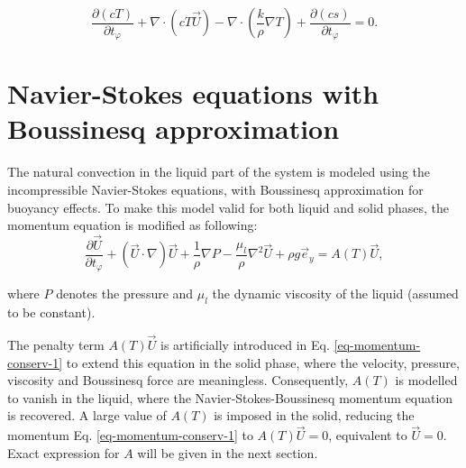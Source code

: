 \begin{equation}\label{eq-energie-enth-model}
\frac{\partial \left(c T\right)}{\partial t_{\varphi}} + \nabla \cdot\left( c T \vec{U}\right) -
\nabla \cdot\left( \frac{k}{\rho} \nabla T \right) +  \frac{\partial \left(c s\right)}{\partial t_{\varphi}}  = 0.
\end{equation}

\section{Navier-Stokes equations with Boussinesq approximation}

The natural convection in the liquid part of the system is modeled using the incompressible Navier-Stokes equations, with  Boussinesq approximation for buoyancy effects. To make this model valid for both liquid and solid phases, the momentum equation is modified as following:
\begin{equation}\label{eq-momentum-conserv-1}
\frac{\partial \vec{U}}{\partial t_{\varphi}} +   {(\vec{U}\cdot\nabla ) \vec{U}} + \frac{1}{\rho}\nabla P - \frac{\mu_{l}}{\rho}   {\nabla^2 \vec{U}} 
+ \rho g \vec{e}_y= A(T) \vec{U},
\end{equation}

\noindent where $P$ denotes the pressure and $\mu_{l}$ the dynamic viscosity of the liquid (assumed to be constant).  

\noindent The penalty term $A(T) \vec{U}$ is artificially introduced in Eq. \ref{eq-momentum-conserv-1} to extend this equation in the solid phase, where the velocity, pressure, viscosity and Boussinesq force are meaningless.  Consequently, $A(T)$  is modelled to vanish in the liquid, where the Navier-Stokes-Boussinesq momentum equation is recovered. A large value of $A(T)$ is imposed in the solid, reducing the momentum Eq. \ref{eq-momentum-conserv-1}  to $A(T) \vec{U}=0$, equivalent to $\vec{U}=0$. Exact expression for $A$ will be given in the next section.

